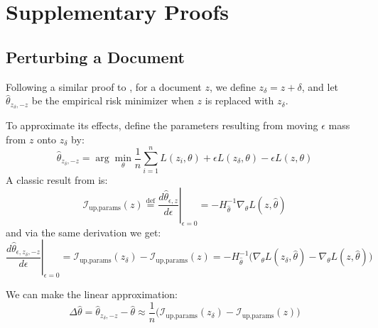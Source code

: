 \documentclass{article}
\theoremstyle{plain}
\theoremstyle{definition}
\theoremstyle{remark}
\begin{document}
\newpage
\appendix
\onecolumn

\section{Supplementary Proofs}

\subsection{Perturbing a Document}
\label{apndx_perturbing}

Following a similar proof to \citet{koh2017understanding}, for a document $z$, we define $z_\delta = z + \delta$, and let $\hat{\theta}_{z_\delta,-z}$ be the empirical risk minimizer when $z$ is replaced with $z_\delta$.

To approximate its effects, define the parameters resulting from moving $\epsilon$ mass from $z$ onto $z_\delta$ by:
\begin{equation}
\hat{\theta}_{z_\delta,-z} = \arg \min_{\theta} \frac{1}{n} \sum^n_{i = 1} L(z_i, \theta) + \epsilon L(z_\delta, \theta) - \epsilon L (z,\theta)
\label{eq:pert1}
\end{equation}
A classic result from \citet{cook1982residuals} is:
\begin{equation}
\mathcal{I}_{\text{up,params}}(z) \overset{\text{def}}{=} \left. \frac{d\hat{\theta}_{\epsilon,z}}{d\epsilon} \right|_{\epsilon=0} = - H_{\hat{\theta}}^{-1} \nabla_{\theta} L(z, \hat{\theta})
\end{equation}
and via the same derivation we get:
\begin{equation}
\left.\frac{d\hat{\theta}_{\epsilon,z_\delta, -z}}{d\epsilon} \right|_{\epsilon=0} =\mathcal{I}_{\text{up,params}}(z_\delta) - \mathcal{I}_{\text{up,params}}(z) =  - H_{\hat{\theta}}^{-1} \big(\nabla_{\theta} L(z_\delta, \hat{\theta})-\nabla_{\theta} L(z, \hat{\theta})\big)
\end{equation}

We can make the linear approximation:
\begin{equation}
    \Delta\hat\theta = \hat\theta_{z_\delta,-z} - \hat\theta \approx \frac{1}{n} \big(\mathcal{I}_{\text{up,params}}(z_\delta) - \mathcal{I}_{\text{up,params}}(z) \big)
\end{equation}
\end{document}
